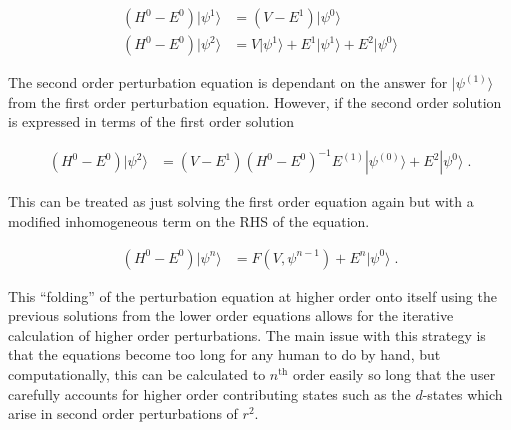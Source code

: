     \begin{align}
        \left( H^0 - E^0 \right) \vert \psi^{1}\rangle &= \left( V - E^{1}\right) \vert \psi^{0} \rangle \\
        \left( H^0 - E^0 \right) \vert \psi^{2}\rangle &= V \vert \psi^{1}\rangle + E^{1} \vert \psi^{1} \rangle + E^{2} \vert \psi^{0} \rangle
    \end{align}

    \noindent The second order perturbation equation is dependant on the answer for $\vert \psi^{(1)} \rangle$ from the first order perturbation equation. However, if the second order solution is expressed in terms of the first order solution

    \begin{align}
        \left( H^0 - E^0 \right) \vert \psi^{2}\rangle &= \left(V - E^{1}\right) (H^0 - E^0)^{-1} E^{(1)} |\psi^{(0)}\rangle + E^{2} |\psi^{0}\rangle\;.
    \end{align}

    \noindent This can be treated as just solving the first order equation again but with a modified inhomogeneous term on the RHS of the equation. 
    
    \begin{align}
        \left( H^0 - E^0 \right) \vert \psi^{n} \rangle &= F(V, \psi^{n-1}) + E^{n} \vert \psi^{0} \rangle\;.
    \end{align}

    \noindent This ``folding'' of the perturbation equation at higher order onto itself using the previous solutions from the lower order equations allows for the iterative calculation of higher order perturbations. The main issue with this strategy is that the equations become too long for any human to do by hand, but computationally, this can be calculated to $n^\text{th}$ order easily so long that the user carefully accounts for higher order contributing states such as the $d$-states which arise in second order perturbations of $r^2$. 

